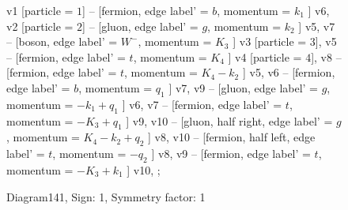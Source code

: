 \documentclass{revtex4}
\begin{document}
\begin{figure}[!htb]
\begin{center}
{    %
v1 [particle = \(1\)] -- [fermion, edge label' = \(b\), momentum = \(k_{1}\) ] v6, 
v2 [particle = \(2\)] -- [gluon, edge label' = \(g\), momentum = \(k_{2}\) ] v5, 
v7 -- [boson, edge label' = \(W^{-}\), momentum = \(K_{3}\) ] v3 [particle = \(3\)], 
v5 -- [fermion, edge label' = \(t\), momentum = \(K_{4}\) ] v4 [particle = \(4\)], 
v8 -- [fermion, edge label' = \(t\), momentum = \(K_{4} - k_{2}\) ] v5, 
v6 -- [fermion, edge label' = \(b\), momentum = \(q_{1}\) ] v7, 
v9 -- [gluon, edge label' = \(g\), momentum = \(-k_{1} + q_{1}\) ] v6, 
v7 -- [fermion, edge label' = \(t\), momentum = \(-K_{3} + q_{1}\) ] v9, 
v10 -- [gluon, half right, edge label' = \(g\), momentum = \(K_{4} - k_{2} + q_{2}\) ] v8, 
v10 -- [fermion, half left, edge label' = \(t\), momentum = \(-q_{2}\) ] v8, 
v9 -- [fermion, edge label' = \(t\), momentum = \(-K_{3} + k_{1}\) ] v10, 
};
\end{center}
\caption{Diagram141, Sign: 1, Symmetry factor: 1}
\end{figure}
\newpage
\end{document}
